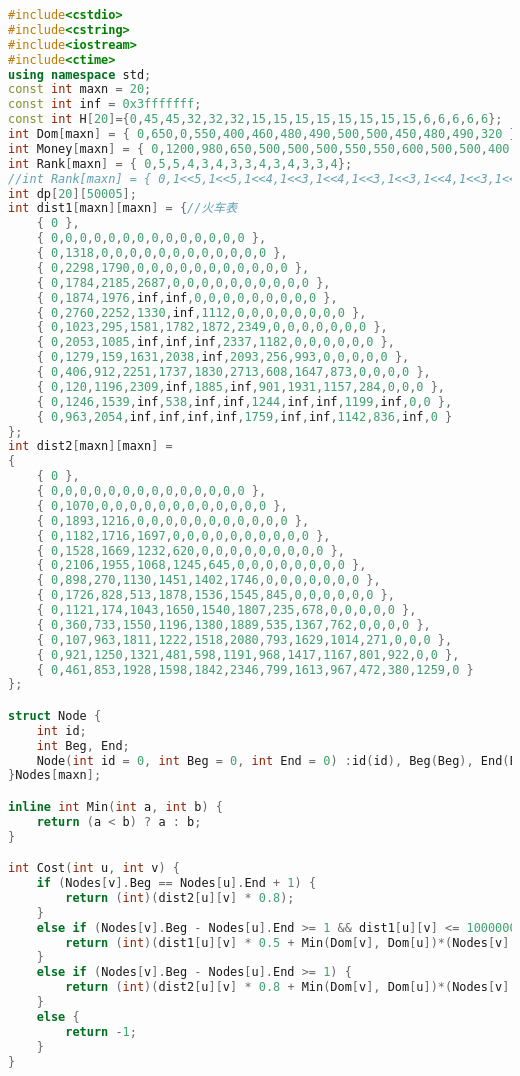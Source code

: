 \begin{lstlisting}[language=C++, numberstyle={\color{black!33}\tiny\sffamily}, basicstyle=\tiny]
#include<cstdio>
#include<cstring>
#include<iostream>
#include<ctime>
using namespace std;
const int maxn = 20;
const int inf = 0x3fffffff;
const int H[20]={0,45,45,32,32,32,15,15,15,15,15,15,15,15,6,6,6,6,6};
int Dom[maxn] = { 0,650,0,550,400,460,480,490,500,500,450,480,490,320 };
int Money[maxn] = { 0,1200,980,650,500,500,500,550,550,600,500,500,400,650 };
int Rank[maxn] = { 0,5,5,4,3,4,3,3,4,3,4,3,3,4};
//int Rank[maxn] = { 0,1<<5,1<<5,1<<4,1<<3,1<<4,1<<3,1<<3,1<<4,1<<3,1<<4,1<<3,1<<3,1<<4};
int dp[20][50005];
int dist1[maxn][maxn] = {//火车表
	{ 0 },
	{ 0,0,0,0,0,0,0,0,0,0,0,0,0,0 },
	{ 0,1318,0,0,0,0,0,0,0,0,0,0,0,0 },
	{ 0,2298,1790,0,0,0,0,0,0,0,0,0,0,0 },
	{ 0,1784,2185,2687,0,0,0,0,0,0,0,0,0,0 },
	{ 0,1874,1976,inf,inf,0,0,0,0,0,0,0,0,0 },
	{ 0,2760,2252,1330,inf,1112,0,0,0,0,0,0,0,0 },
	{ 0,1023,295,1581,1782,1872,2349,0,0,0,0,0,0,0 },
	{ 0,2053,1085,inf,inf,inf,2337,1182,0,0,0,0,0,0 },
	{ 0,1279,159,1631,2038,inf,2093,256,993,0,0,0,0,0 },
	{ 0,406,912,2251,1737,1830,2713,608,1647,873,0,0,0,0 },
	{ 0,120,1196,2309,inf,1885,inf,901,1931,1157,284,0,0,0 },
	{ 0,1246,1539,inf,538,inf,inf,1244,inf,inf,1199,inf,0,0 },
	{ 0,963,2054,inf,inf,inf,inf,1759,inf,inf,1142,836,inf,0 }
};
int dist2[maxn][maxn] =
{
	{ 0 },
	{ 0,0,0,0,0,0,0,0,0,0,0,0,0,0 },
	{ 0,1070,0,0,0,0,0,0,0,0,0,0,0,0 },
	{ 0,1893,1216,0,0,0,0,0,0,0,0,0,0,0 },
	{ 0,1182,1716,1697,0,0,0,0,0,0,0,0,0,0 },
	{ 0,1528,1669,1232,620,0,0,0,0,0,0,0,0,0 },
	{ 0,2106,1955,1068,1245,645,0,0,0,0,0,0,0,0 },
	{ 0,898,270,1130,1451,1402,1746,0,0,0,0,0,0,0 },
	{ 0,1726,828,513,1878,1536,1545,845,0,0,0,0,0,0 },
	{ 0,1121,174,1043,1650,1540,1807,235,678,0,0,0,0,0 },
	{ 0,360,733,1550,1196,1380,1889,535,1367,762,0,0,0,0 },
	{ 0,107,963,1811,1222,1518,2080,793,1629,1014,271,0,0,0 },
	{ 0,921,1250,1321,481,598,1191,968,1417,1167,801,922,0,0 },
	{ 0,461,853,1928,1598,1842,2346,799,1613,967,472,380,1259,0 }
};

struct Node {
	int id;
	int Beg, End;
	Node(int id = 0, int Beg = 0, int End = 0) :id(id), Beg(Beg), End(End) {}
}Nodes[maxn];

inline int Min(int a, int b) {
	return (a < b) ? a : b;
}

int Cost(int u, int v) {
	if (Nodes[v].Beg == Nodes[u].End + 1) {
		return (int)(dist2[u][v] * 0.8);
	}
	else if (Nodes[v].Beg - Nodes[u].End >= 1 && dist1[u][v] <= 1000000) {
		return (int)(dist1[u][v] * 0.5 + Min(Dom[v], Dom[u])*(Nodes[v].Beg - Nodes[u].End - 1));
	}
	else if (Nodes[v].Beg - Nodes[u].End >= 1) {
		return (int)(dist2[u][v] * 0.8 + Min(Dom[v], Dom[u])*(Nodes[v].Beg - Nodes[u].End - 1));
	}
	else {
		return -1;
	}
}


\end{lstlisting}

